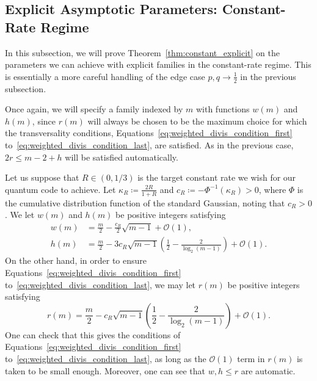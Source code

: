 \documentclass{article}
\begin{document}
\subsection{Explicit Asymptotic Parameters: Constant-Rate Regime}\label{subsec:explicit_constant_rate}

In this subsection, we will prove Theorem~\ref{thm:constant_explicit} on the parameters we can achieve with explicit families in the constant-rate regime. This is essentially a more careful handling of the edge case $p,q \to \frac{1}{2}$ in the previous subsection. 

Once again, we will specify a family indexed by $m$ with functions $w(m)$ and $h(m)$, since $r(m)$ will always be chosen to be the maximum choice for which the transversality conditions, Equations~\eqref{eq:weighted_divis_condition_first} to~\eqref{eq:weighted_divis_condition_last}, are satisfied. As in the previous case, $2r \leq m-2+h$ will be satisfied automatically.

Let us suppose that $R \in (0,1/3)$ is the target constant rate we wish for our quantum code to achieve. Let $\kappa_R \coloneq \frac{2R}{1+R}$ and $c_R \coloneq -\Phi^{-1}(\kappa_R)>0$, where $\Phi$ is the cumulative distribution function of the standard Gaussian, noting that $c_R > 0$. We let $w(m)$ and $h(m)$ be positive integers satisfying
\begin{align}
    w(m) &= \frac{m}{2} - \frac{c_R}{2}\sqrt{m-1} + \mathcal{O}(1),\\
    h(m) &= \frac{m}{2} - 3c_R\sqrt{m-1}\left(\frac{1}{2}-\frac{2}{\log_2(m-1)}\right)+\mathcal{O}(1).
\end{align}
On the other hand, in order to ensure Equations~\eqref{eq:weighted_divis_condition_first} to~\eqref{eq:weighted_divis_condition_last}, we may let $r(m)$ be positive integers satisfying
\begin{equation}
    r(m) = \frac{m}{2}-c_R\sqrt{m-1}\left(\frac{1}{2}-\frac{2}{\log_2(m-1)}\right) + \mathcal{O}(1).
\end{equation}
One can check that this gives the conditions of Equations~\eqref{eq:weighted_divis_condition_first} to~\eqref{eq:weighted_divis_condition_last}, as long as the $\mathcal{O}(1)$ term in $r(m)$ is taken to be small enough. Moreover, one can see that $w,h \leq r$ are automatic.
\end{document}
